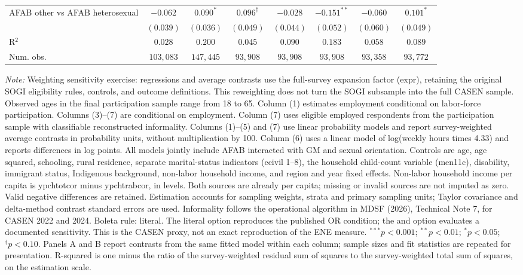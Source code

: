 \begin{table}[htpb!]
{\begin{tabular}{l c c c c c c c}
AFAB other vs AFAB heterosexual & $-0.062$ & $0.090^{*}$ & $0.096^{\dagger}$ & $-0.028$ & $-0.151^{**}$ & $-0.060$ & $0.101^{*}$ \\
 & $(0.039)$ & $(0.036)$ & $(0.049)$ & $(0.044)$ & $(0.052)$ & $(0.060)$ & $(0.049)$ \\
\hline
R$^2$ & $0.028$ & $0.200$ & $0.045$ & $0.090$ & $0.183$ & $0.058$ & $0.089$ \\
Num. obs. & $103,083$ & $147,445$ & $93,908$ & $93,908$ & $93,908$ & $93,358$ & $93,772$ \\
\hline
\end{tabular}%
}
\par\vspace{1ex}
\begin{minipage}{\textwidth}\footnotesize\raggedright
\textit{Note:} Weighting sensitivity exercise: regressions and average contrasts use the full-survey expansion factor (expr), retaining the original SOGI eligibility rules, controls, and outcome definitions. This reweighting does not turn the SOGI subsample into the full CASEN sample. Observed ages in the final participation sample range from 18 to 65. Column (1) estimates employment conditional on labor-force participation. Columns (3)--(7) are conditional on employment.  Column (7) uses eligible employed respondents from the participation sample with classifiable reconstructed informality. Columns (1)--(5) and (7) use linear probability models and report survey-weighted average contrasts in probability units, without multiplication by 100. Column (6) uses a linear model of log(weekly hours times 4.33) and reports differences in log points. All models jointly include AFAB interacted with GM and sexual orientation. Controls are age, age squared, schooling, rural residence, separate marital-status indicators (ecivil 1--8), the household child-count variable (men11c), disability, immigrant status, Indigenous background, non-labor household income, and region and year fixed effects. Non-labor household income per capita is ypchtotcor minus ypchtrabcor, in levels. Both sources are already per capita; missing or invalid sources are not imputed as zero. Valid negative differences are retained. Estimation accounts for sampling weights, strata and primary sampling units; Taylor covariance and delta-method contrast standard errors are used. Informality follows the operational algorithm in MDSF (2026), Technical Note 7, for CASEN 2022 and 2024. Boleta rule: literal. The literal option reproduces the published OR condition; the and option evaluates a documented sensitivity. This is the CASEN proxy, not an exact reproduction of the ENE measure. $^{***}p<0.001$; $^{**}p<0.01$; $^{*}p<0.05$; $^{\dagger}p<0.10$. Panels A and B report contrasts from the same fitted model within each column; sample sizes and fit statistics are repeated for presentation. R-squared is one minus the ratio of the survey-weighted residual sum of squares to the survey-weighted total sum of squares, on the estimation scale.
\end{minipage}
\end{table}
